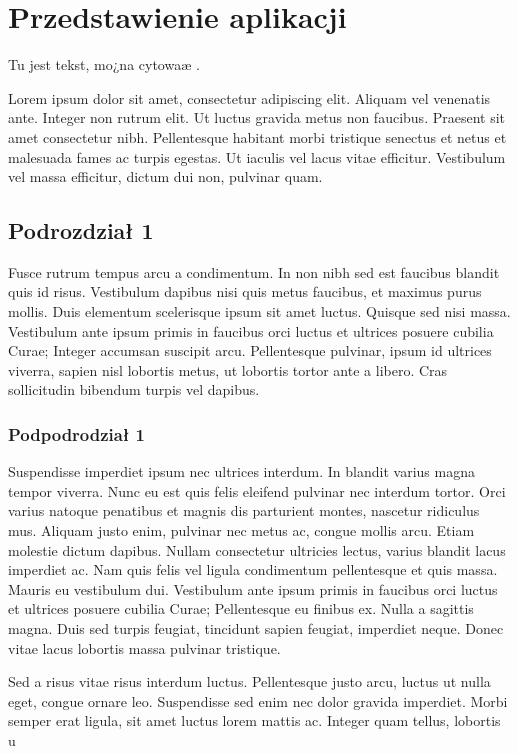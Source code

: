 \chapter{Przedstawienie aplikacji}

Tu jest tekst, mo¿na cytowaæ \cite{article_1}.

Lorem ipsum dolor sit amet, consectetur adipiscing elit. Aliquam vel venenatis ante. Integer non rutrum elit. Ut luctus gravida metus non faucibus. Praesent sit amet consectetur nibh. Pellentesque habitant morbi tristique senectus et netus et malesuada fames ac turpis egestas. Ut iaculis vel lacus vitae efficitur. Vestibulum vel massa efficitur, dictum dui non, pulvinar quam.

\section{Podrozdział 1}

Fusce rutrum tempus arcu a condimentum. In non nibh sed est faucibus blandit quis id risus. Vestibulum dapibus nisi quis metus faucibus, et maximus purus mollis. Duis elementum scelerisque ipsum sit amet luctus. Quisque sed nisi massa. Vestibulum ante ipsum primis in faucibus orci luctus et ultrices posuere cubilia Curae; Integer accumsan suscipit arcu. Pellentesque pulvinar, ipsum id ultrices viverra, sapien nisl lobortis metus, ut lobortis tortor ante a libero. Cras sollicitudin bibendum turpis vel dapibus. \cite{misc_1}

\subsection{Podpodrodział 1}

Suspendisse imperdiet ipsum nec ultrices interdum. In blandit varius magna tempor viverra. Nunc eu est quis felis eleifend pulvinar nec interdum tortor. Orci varius natoque penatibus et magnis dis parturient montes, nascetur ridiculus mus. Aliquam justo enim, pulvinar nec metus ac, congue mollis arcu. Etiam molestie dictum dapibus. Nullam consectetur ultricies lectus, varius blandit lacus imperdiet ac. Nam quis felis vel ligula condimentum pellentesque et quis massa. Mauris eu vestibulum dui. Vestibulum ante ipsum primis in faucibus orci luctus et ultrices posuere cubilia Curae; Pellentesque eu finibus ex. Nulla a sagittis magna. Duis sed turpis feugiat, tincidunt sapien feugiat, imperdiet neque. Donec vitae lacus lobortis massa pulvinar tristique.

Sed a risus vitae risus interdum luctus. Pellentesque justo arcu, luctus ut nulla eget, congue ornare leo. Suspendisse sed enim nec dolor gravida imperdiet. Morbi semper erat ligula, sit amet luctus lorem mattis ac. Integer quam tellus, lobortis u

